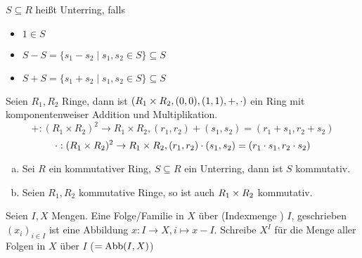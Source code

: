 \documentclass[a4paper]{report}
\begin{document}
\begin{defi}
  $S \subseteq R$ heißt Unterring, falls
  \begin{itemize}
    \item $1 \in S$
    \item $S - S = \{s_{1}-s_{2} \mid s_{1}, s_{2} \in S\} \subseteq S$
    \item $S + S = \{s_{1}+s_{2} \mid s_{1}, s_{2} \in S\} \subseteq S$
  \end{itemize}
\end{defi}
\begin{defi*}
  Seien $R_{1}, R_{2}$ Ringe, dann ist $(R_{1} \times R_{2}, (0,0), (1,1), +, \cdot)$ ein Ring mit komponentenweiser Addition und Multiplikation.
  \[+ : (R_{1} \times R_{2})^{2} \to R_{1} \times R_{2}, (r_{1}, r_{2}) + (s_{1}, s_{2}) = (r_{1} + s_{1}, r_{2} + s_{2})\]
  \[\cdot : (R_{1} \times R_{2})^{2} \to R_{1} \times R_{2}, (r_{1}, r_{2}) \cdot (s_{1}, s_{2}) = (r_{1} \cdot s_{1}, r_{2} \cdot s_{2})\]
\end{defi*}

\begin{bem*}[Übung]\item
  \begin{enumerate}[(a)]
    \item Sei $R$ ein kommutativer Ring, $S \subseteq R$ ein Unterring, dann ist $S$ kommutativ.
    \item Seien $R_{1}, R_{2}$ kommutative Ringe, so ist auch $R_{1} \times R_{2}$ kommutativ.
  \end{enumerate}
\end{bem*}

\begin{whg*}
Seien $I, X$ Mengen. Eine Folge/Familie in $X$ über (Indexmenge ) $I$, geschrieben $(x_{i})_{i \in I}$ ist eine Abbildung $x: I \to X, i \mapsto x-I$. Schreibe $X^{I}$ für die Menge aller Folgen in $X$ über $I$ ($=\operatorname{Abb}(I,X)$)
\end{whg*}
\end{document}
